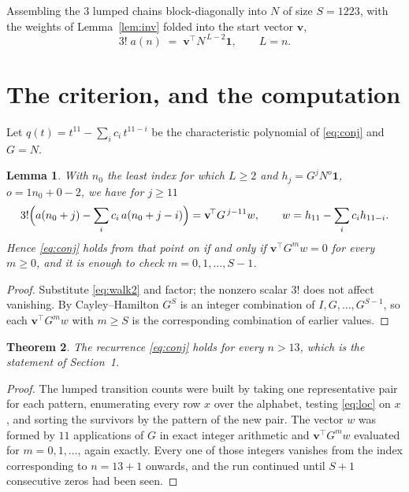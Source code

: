 \documentclass[11pt,a4paper]{article}
\theoremstyle{plain}
\newtheorem{theorem}{Theorem}
\newtheorem{lemma}[theorem]{Lemma}
\theoremstyle{definition}
\begin{document}
Assembling the $3$ lumped chains block-diagonally into $N$ of size $S=1223$, with the
weights of Lemma~\ref{lem:inv} folded into the start vector $\mathbf{v}$,
\begin{equation}\label{eq:walk2}
3!\;a(n)\;=\;\mathbf{v}^{\!\top}N^{\,L-2}\mathbf{1},\qquad L=n .
\end{equation}

\section{The criterion, and the computation}

Let $q(t)=t^{11}-\sum_i c_i\,t^{11-i}$ be the characteristic polynomial of
\eqref{eq:conj} and $G=N$.

\begin{lemma}\label{lem:crit}
With $n_0$ the least index for which $L\ge2$ and $h_j=G^{j}N^{o}\mathbf{1}$,
$o=1n_0+0-2$, we have for $j\ge11$
\[
3!\Bigl(a(n_0+j)-\sum_i c_i\,a(n_0+j-i)\Bigr)
=\mathbf{v}^{\!\top}G^{\,j-11}w,\qquad
w=h_{11}-\sum_i c_i h_{11-i} .
\]
Hence \eqref{eq:conj} holds from that point on if and only if
$\mathbf{v}^{\!\top}G^{m}w=0$ for every $m\ge0$, and it is enough to check
$m=0,1,\dots,S-1$.
\end{lemma}

\begin{proof}
Substitute \eqref{eq:walk2} and factor; the nonzero scalar $3!$ does not affect
vanishing. By Cayley--Hamilton $G^{S}$ is an integer combination of $I,G,\dots,G^{S-1}$,
so each $\mathbf{v}^{\!\top}G^{m}w$ with $m\ge S$ is the corresponding combination of
earlier values.
\end{proof}

\begin{theorem}
The recurrence \eqref{eq:conj} holds for every $n>13$, which is the statement of
Section~1.
\end{theorem}

\begin{proof}
The lumped transition counts were built by taking one representative pair for each pattern,
enumerating every row $x$ over the alphabet, testing \eqref{eq:loc} on $x$, and sorting
the survivors by the pattern of the new pair. The vector $w$ was formed by $11$
applications of $G$ in exact integer arithmetic and $\mathbf{v}^{\!\top}G^{m}w$
evaluated for $m=0,1,\dots$, again exactly. Every one of those integers vanishes from the
index corresponding to $n=13+1$ onwards, and the run continued until $S+1$ consecutive
zeros had been seen.
\end{proof}
\end{document}
